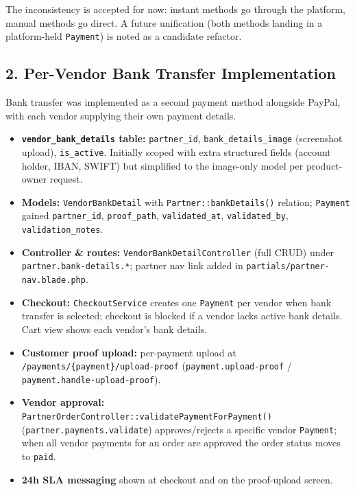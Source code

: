 \documentclass[12pt,a4paper]{article}
\begin{document}
The inconsistency is accepted for now: instant methods go through the platform, manual methods go direct. A future unification (both methods landing in a platform-held \texttt{Payment}) is noted as a candidate refactor.

\subsection{2. Per-Vendor Bank Transfer Implementation}

Bank transfer was implemented as a second payment method alongside PayPal, with each vendor supplying their own payment details.

\begin{itemize}
    \item \textbf{\texttt{vendor\_bank\_details} table:} \texttt{partner\_id}, \texttt{bank\_details\_image} (screenshot upload), \texttt{is\_active}. Initially scoped with extra structured fields (account holder, IBAN, SWIFT) but simplified to the image-only model per product-owner request.
    \item \textbf{Models:} \texttt{VendorBankDetail} with \texttt{Partner::bankDetails()} relation; \texttt{Payment} gained \texttt{partner\_id}, \texttt{proof\_path}, \texttt{validated\_at}, \texttt{validated\_by}, \texttt{validation\_notes}.
    \item \textbf{Controller \& routes:} \texttt{VendorBankDetailController} (full CRUD) under \texttt{partner.bank-details.*}; partner nav link added in \texttt{partials/partner-nav.blade.php}.
    \item \textbf{Checkout:} \texttt{CheckoutService} creates one \texttt{Payment} per vendor when bank transfer is selected; checkout is blocked if a vendor lacks active bank details. Cart view shows each vendor's bank details.
    \item \textbf{Customer proof upload:} per-payment upload at \texttt{/payments/\{payment\}/upload-proof} (\texttt{payment.upload-proof} / \texttt{payment.handle-upload-proof}).
    \item \textbf{Vendor approval:} \texttt{PartnerOrderController::validatePaymentForPayment()} (\texttt{partner.payments.validate}) approves/rejects a specific vendor \texttt{Payment}; when all vendor payments for an order are approved the order status moves to \texttt{paid}.
    \item \textbf{24h SLA messaging} shown at checkout and on the proof-upload screen.
\end{itemize}
\end{document}
